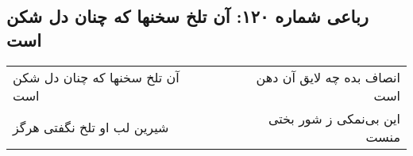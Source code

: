 \begin{center}
\section*{رباعی شماره ۱۲۰: آن تلخ سخنها که چنان دل شکن است}
\label{sec:0120}
\begin{longtable}{l p{0.5cm} r}
آن تلخ سخنها که چنان دل شکن است
&&
انصاف بده چه لایق آن دهن است
\\
شیرین لب او تلخ نگفتی هرگز
&&
این بی‌نمکی ز شور بختی منست
\\
\end{longtable}
\end{center}
